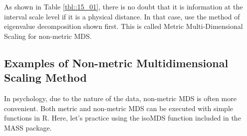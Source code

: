 \documentclass{ltjsbook}
\begin{document}
As shown in Table \ref{tbl::15_01}, there is no doubt that it is information at the interval scale level if it is a physical distance. In that case, use the method of eigenvalue decomposition shown first. This is called Metric Multi-Dimensional Scaling for non-metric MDS.


\subsection{Examples of Non-metric Multidimensional Scaling Method}

In psychology, due to the nature of the data, non-metric MDS is often more convenient. Both metric and non-metric MDS can be executed with simple functions in R. Here, let's practice using the isoMDS function included in the MASS package.
\end{document}
